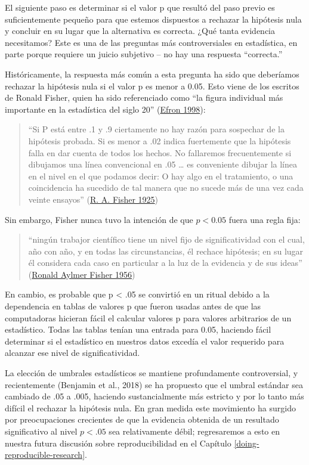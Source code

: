 \documentclass[
  12pt,
]{book}
\theoremstyle{definition}
\theoremstyle{definition}
\theoremstyle{definition}
\theoremstyle{remark}
\begin{document}
El siguiente paso es determinar si el valor p que resultó del paso previo es suficientemente pequeño para que estemos dispuestos a rechazar la hipótesis nula y concluir en su lugar que la alternativa es correcta. ¿Qué tanta evidencia necesitamos? Este es una de las preguntas más controversiales en estadística, en parte porque requiere un juicio subjetivo -- no hay una respuesta ``correcta.''

Históricamente, la respuesta más común a esta pregunta ha sido que deberíamos rechazar la hipótesis nula si el valor p es menor a 0.05. Esto viene de los escritos de Ronald Fisher, quien ha sido referenciado como ``la figura individual más importante en la estadística del siglo 20'' (\protect\hyperlink{ref-efron1998}{Efron 1998}):

\begin{quote}
``Si P está entre .1 y .9 ciertamente no hay razón para sospechar de la hipótesis probada. Si es menor a .02 indica fuertemente que la hipótesis falla en dar cuenta de todos los hechos. No fallaremos frecuentemente si dibujamos una línea convencional en .05 \ldots{} es conveniente dibujar la línea en el nivel en el que podamos decir: O hay algo en el tratamiento, o una coincidencia ha sucedido de tal manera que no sucede más de una vez cada veinte ensayos'' (\protect\hyperlink{ref-fisher1925statistical}{R. A. Fisher 1925})
\end{quote}

Sin embargo, Fisher nunca tuvo la intención de que \(p < 0.05\) fuera una regla fija:

\begin{quote}
``ningún trabajor científico tiene un nivel fijo de significatividad con el cual, año con año, y en todas las circunstancias, él rechace hipótesis; en su lugar él considera cada caso en particular a la luz de la evidencia y de sus ideas'' (\protect\hyperlink{ref-fish:1956}{Ronald Aylmer Fisher 1956})
\end{quote}

En cambio, es probable que p \textless{} .05 se convirtió en un ritual debido a la dependencia en tablas de valores p que fueron usadas antes de que las computadoras hicieran fácil el calcular valores p para valores arbitrarios de un estadístico. Todas las tablas tenían una entrada para 0.05, haciendo fácil determinar si el estadístico en nuestros datos excedía el valor requerido para alcanzar ese nivel de significatividad.

La elección de umbrales estadísticos se mantiene profundamente controversial, y recientemente (Benjamin et al., 2018) se ha propuesto que el umbral estándar sea cambiado de .05 a .005, haciendo sustancialmente más estricto y por lo tanto más difícil el rechazar la hipótesis nula. En gran medida este movimiento ha surgido por preocupaciones crecientes de que la evidencia obtenida de un resultado significativo al nivel \(p < .05\) sea relativamente débil; regresaremos a esto en nuestra futura discusión sobre reproducibilidad en el Capítulo \ref{doing-reproducible-research}.
\end{document}
